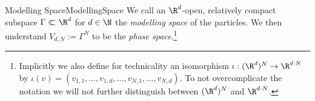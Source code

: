 \begin{mdef}{Modelling Space}{ModellingSpace}
    We call an $\R^d$-open, relatively compact subspace $\Gamma\relcom\R^d$ for $d\in\N$ the \emph{modelling space} of the particles. We then understand $V_{d,N}:=\Gamma^N$ to be the \emph{phase space}.\footnote{Implicitly we also define for technicality an isomorphism $\iota:(\R^d)^N\to\R^{d\cdot N}$ by $\iota(v) = (v_{1,1},\ldots,v_{1,d},\ldots,v_{N,1},\ldots,v_{N,d})$. To not overcomplicate the notation we will not further distinguish between $(\R^d)^N$ and $\R^{d\cdot N}$.}
\end{mdef}